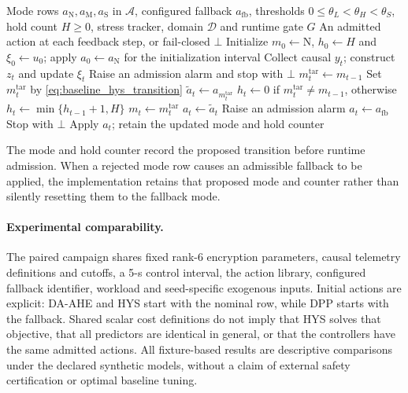 \begin{algorithm}[t]
\caption{Runtime-Admitted Held-Mode Hysteresis}
\label{alg:hys}
\small
\begin{algorithmic}[1]
\Require Mode rows $a_{\mathrm{N}},a_{\mathrm{M}},a_{\mathrm{S}}$ in $\mathcal{A}$,
 configured fallback $a_{\mathrm{fb}}$, thresholds
 $0\leq\theta_L<\theta_H<\theta_S$, hold count $H\geq0$,
 stress tracker, domain $\mathcal{D}$ and runtime gate $G$
\Ensure An admitted action at each feedback step, or fail-closed $\bot$
\State Initialize $m_0\gets\mathrm{N}$, $h_0\gets H$ and $\xi_0\gets u_0$;
 apply $a_0\gets a_{\mathrm{N}}$ for the initialization interval
 \State Collect causal $y_t$; construct $z_t$ and update $\xi_t$
  \State Raise an admission alarm and stop with $\bot$
 \EndIf
 \State $m_t^{\mathrm{tar}}\gets m_{t-1}$
  \State Set $m_t^{\mathrm{tar}}$ by \eqref{eq:baseline_hys_transition}
 \EndIf
 \State $\widetilde{a}_t\gets a_{m_t^{\mathrm{tar}}}$
 \State $h_t\gets0$ if $m_t^{\mathrm{tar}}\neq m_{t-1}$,
 otherwise $h_t\gets\min\{h_{t-1}+1,H\}$
 \State $m_t\gets m_t^{\mathrm{tar}}$
  \State $a_t\gets\widetilde{a}_t$
 \Else
  \State Raise an admission alarm
   \State $a_t\gets a_{\mathrm{fb}}$
  \Else
   \State Stop with $\bot$
  \EndIf
 \EndIf
 \State Apply $a_t$; retain the updated mode and hold counter
\EndFor
\end{algorithmic}
\end{algorithm}

The mode and hold counter record the proposed transition before runtime
admission. When a rejected mode row causes an admissible fallback to be applied,
the implementation retains that proposed mode and counter rather than silently
resetting them to the fallback mode.

\paragraph{Experimental comparability.}
The paired campaign shares fixed rank-6 encryption parameters, causal telemetry
definitions and cutoffs, a 5-s control interval, the action library, configured
fallback identifier, workload and seed-specific exogenous inputs. Initial
actions are explicit: DA-AHE and HYS start with the nominal row, while DPP
starts with the fallback. Shared scalar cost definitions do not imply that HYS
solves that objective, that all predictors are identical in general, or that
the controllers have the same admitted actions. All fixture-based results are
descriptive comparisons under the declared synthetic models, without a claim
of external safety certification or optimal baseline tuning.
